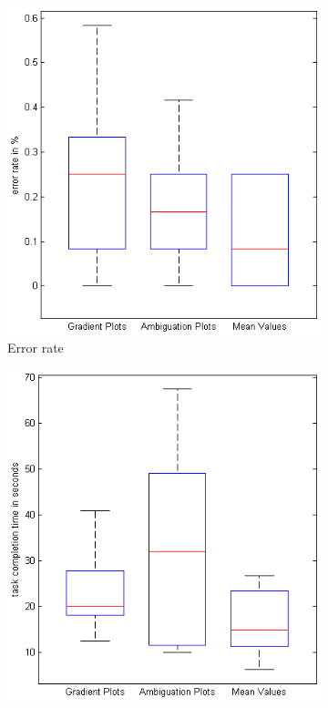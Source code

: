 \begin{figure}[H]
    \centering
    \begin{subfigure}[b]{0.32\textwidth}
        \includegraphics[width=\textwidth]{figures/boxplots/s3_error.png}
        \caption{Error rate}
        \label{fig:s3_error}
    \end{subfigure}
    \begin{subfigure}[b]{0.32\textwidth}
        \includegraphics[width=\textwidth]{figures/boxplots/s3_time.png}

\end{subfigure}
\end{figure}
